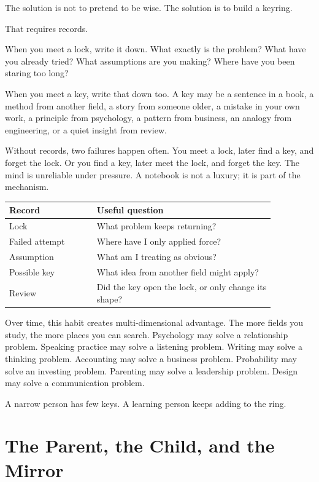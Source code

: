 The solution is not to pretend to be wise. The solution is to build a keyring.

That requires records.

When you meet a lock, write it down. What exactly is the problem? What have you already tried? What assumptions are you making? Where have you been staring too long?

When you meet a key, write that down too. A key may be a sentence in a book, a method from another field, a story from someone older, a mistake in your own work, a principle from psychology, a pattern from business, an analogy from engineering, or a quiet insight from review.

Without records, two failures happen often. You meet a lock, later find a key, and forget the lock. Or you find a key, later meet the lock, and forget the key. The mind is unreliable under pressure. A notebook is not a luxury; it is part of the mechanism.

\begin{center}
\begin{tabular}{p{0.28\linewidth}p{0.58\linewidth}}
\hline
Record & Useful question \\
\hline
Lock & What problem keeps returning? \\
Failed attempt & Where have I only applied force? \\
Assumption & What am I treating as obvious? \\
Possible key & What idea from another field might apply? \\
Review & Did the key open the lock, or only change its shape? \\
\hline
\end{tabular}
\end{center}

Over time, this habit creates multi-dimensional advantage. The more fields you study, the more places you can search. Psychology may solve a relationship problem. Speaking practice may solve a listening problem. Writing may solve a thinking problem. Accounting may solve a business problem. Probability may solve an investing problem. Parenting may solve a leadership problem. Design may solve a communication problem.

A narrow person has few keys. A learning person keeps adding to the ring.

\section*{The Parent, the Child, and the Mirror}

